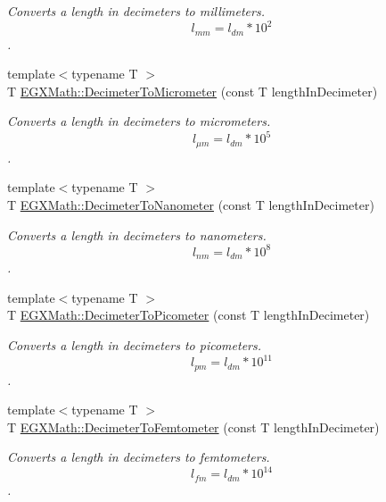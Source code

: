 \begin{DoxyCompactItemize}
\begin{DoxyCompactList}\small\item\em Converts a length in decimeters to millimeters. \[ l_{mm}=l_{dm} * 10^{2} \]. \end{DoxyCompactList}\item 
{\footnotesize template$<$typename T $>$ }\\T \mbox{\hyperlink{group___e_g_x_math-_conversions-_length_conversions-_s_i-_decimeter-_s_i_ga5cf28083fa005b5a6a0dd6817c1633b7}{E\+G\+X\+Math\+::\+Decimeter\+To\+Micrometer}} (const T length\+In\+Decimeter)
\begin{DoxyCompactList}\small\item\em Converts a length in decimeters to micrometers. \[ l_{\mu m}=l_{dm} * 10^{5} \]. \end{DoxyCompactList}\item 
{\footnotesize template$<$typename T $>$ }\\T \mbox{\hyperlink{group___e_g_x_math-_conversions-_length_conversions-_s_i-_decimeter-_s_i_ga5bf2905937fea582ee35031d9017807f}{E\+G\+X\+Math\+::\+Decimeter\+To\+Nanometer}} (const T length\+In\+Decimeter)
\begin{DoxyCompactList}\small\item\em Converts a length in decimeters to nanometers. \[ l_{nm}=l_{dm} * 10^{8} \]. \end{DoxyCompactList}\item 
{\footnotesize template$<$typename T $>$ }\\T \mbox{\hyperlink{group___e_g_x_math-_conversions-_length_conversions-_s_i-_decimeter-_s_i_gaac5fa4b7b538abe2d19f33e131e9bbde}{E\+G\+X\+Math\+::\+Decimeter\+To\+Picometer}} (const T length\+In\+Decimeter)
\begin{DoxyCompactList}\small\item\em Converts a length in decimeters to picometers. \[ l_{pm}=l_{dm} * 10^{11} \]. \end{DoxyCompactList}\item 
{\footnotesize template$<$typename T $>$ }\\T \mbox{\hyperlink{group___e_g_x_math-_conversions-_length_conversions-_s_i-_decimeter-_s_i_gab06170fbc8b349582e4ae34d41f3f706}{E\+G\+X\+Math\+::\+Decimeter\+To\+Femtometer}} (const T length\+In\+Decimeter)
\begin{DoxyCompactList}\small\item\em Converts a length in decimeters to femtometers. \[ l_{fm}=l_{dm} * 10^{14} \]. \end{DoxyCompactList}\item 

\end{DoxyCompactItemize}
